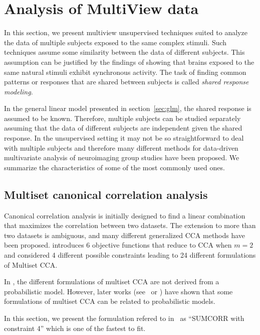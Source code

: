 \section{Analysis of MultiView data}
In this section, we present multiview unsupervised techniques suited to
analyze the data of multiple subjects exposed to the same complex stimuli. Such
techniques assume some similarity between the data of different subjects. This
assumption can be justified by the findings of \cite{hasson2004intersubject} showing that brains exposed to the same natural stimuli exhibit synchronous activity.
The task of finding common patterns or responses that are shared between
subjects is called \emph{shared response modeling}.

In the general linear model presented in
section~\ref{sec:glm}, the shared response is assumed to be known. Therefore,
multiple subjects can be studied separately assuming that the data of different
subjects are independent given the shared response.
In the unsupervised setting it may not be so straightforward to deal with
multiple subjects and therefore many different
methods for data-driven multivariate analysis of neuroimaging group studies
have been proposed.
We summarize the characteristics of some of the most commonly used ones.


\subsection{Multiset canonical correlation analysis}
\label{sec:mcca}
Canonical correlation analysis is initially designed to find a linear
combination that maximizes the correlation between two datasets.
The extension to more than two datasets is ambiguous, and many
different generalized CCA methods have been proposed. \cite{kettenring1971canonical} introduces 6 objective functions that reduce to CCA when $m=2$ and \cite{nielsen2002multiset} considered 4 different possible constraints leading to 24 different formulations of Multiset CCA.

In \cite{kettenring1971canonical}, the different formulations of multiset CCA
  are not derived from a probabilistic model. However, later works
  (see~\cite{li2009joint} or \cite{adali2014diversity}) have shown that some
  formulations of multiset CCA can be related to probabilistic models.


In this section, we present the formulation refered to
in~\cite{nielsen2002multiset} as ``SUMCORR with constraint 4'' which is one of the
fastest to fit.

